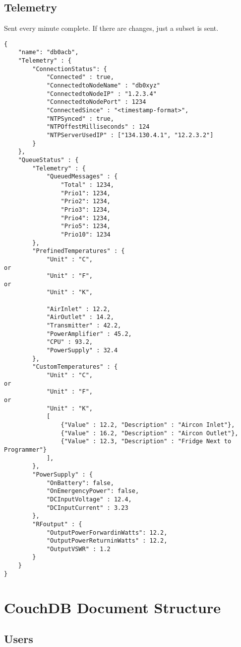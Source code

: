 \documentclass[a4paper]{article}
\begin{document}
\subsection{Telemetry}
Sent every minute complete. If there are changes, just a subset is sent.
\begin{lstlisting}
{
    "name": "db0acb",
    "Telemetry" : {
        "ConnectionStatus": {
            "Connected" : true,
            "ConnectedtoNodeName" : "db0xyz"
            "ConnectedtoNodeIP" : "1.2.3.4"
            "ConnectedtoNodePort" : 1234
            "ConnectedSince" : "<timestamp-format>",
	    	"NTPSynced" : true,
            "NTPOffestMilliseconds" : 124
            "NTPServerUsedIP" : ["134.130.4.1", "12.2.3.2"]
        }
    },
    "QueueStatus" : {
        "Telemetry" : {
            "QueuedMessages" : {
                "Total" : 1234,
                "Prio1": 1234,
                "Prio2": 1234,
                "Prio3": 1234,
                "Prio4": 1234,
                "Prio5": 1234,
                "Prio10": 1234
        },
        "PrefinedTemperatures" : {
            "Unit" : "C",
or
            "Unit" : "F",
or
            "Unit" : "K",
         
            "AirInlet" : 12.2,
            "AirOutlet" : 14.2,
            "Transmitter" : 42.2,
            "PowerAmplifier" : 45.2,
            "CPU" : 93.2,
            "PowerSupply" : 32.4
        },
        "CustomTemperatures" : {
            "Unit" : "C",
or
            "Unit" : "F",
or
            "Unit" : "K",
            [
                {"Value" : 12.2, "Description" : "Aircon Inlet"},
                {"Value" : 16.2, "Description" : "Aircon Outlet"},
                {"Value" : 12.3, "Description" : "Fridge Next to Programmer"}
            ],
        },
        "PowerSupply" : {
            "OnBattery": false,
            "OnEmergencyPower": false,
            "DCInputVoltage" : 12.4,
            "DCInputCurrent" : 3.23
        },
        "RFoutput" : {
            "OutputPowerForwardinWatts": 12.2,
            "OutputPowerReturninWatts" : 12.2,
            "OutputVSWR" : 1.2
        }
    }
}
\end{lstlisting}


\section{CouchDB Document Structure}

\subsection{Users}
\end{document}
